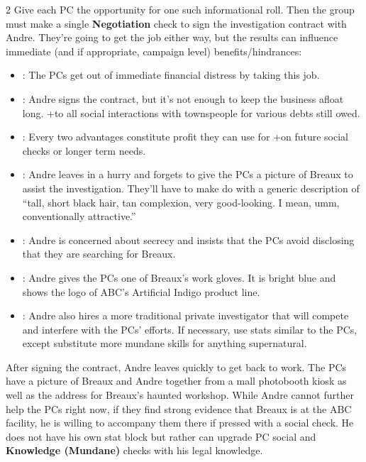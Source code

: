 \documentclass{book}
\newcommand{\df}{\DifficultyDie }
\newcommand{\stb}{\SetbackDie }
\newcommand{\ch}{\ChallengeDie }
\newcommand{\bbb}{\BoostDie }
\newcommand{\ai}{{\color{cyan}Artificial Indigo}\xspace}
\begin{document}
\begin{multicols*}{2}
Give each PC the opportunity for one such informational roll.  Then the group must make a single \ch\df\df\textbf{Negotiation} check to sign the investigation contract with Andre.  They're going to get the job either way, but the results can influence immediate (and if appropriate, campaign level) benefits/hindrances:

\begin{itemize}
    \setlength\itemsep{-.5em}
        \item \Success: The PCs get out of immediate financial distress by taking this job.
        \item \Failure: Andre signs the contract, but it's not enough to keep the business afloat long.  +\stb to all social interactions with townspeople for various debts still owed.
        \item \Advantage\Advantage: Every two advantages constitute profit they can use for +\bbb on future social checks or longer term needs.
        \item \Threat\Threat: Andre leaves in a hurry and forgets to give the PCs a picture of Breaux to assist the investigation.  They'll have to make do with a generic description of ``tall, short black hair, tan complexion, very good-looking.  I mean, umm, conventionally attractive.''
        \item \Threat\Threat\Threat: Andre is concerned about secrecy and insists that the PCs avoid disclosing that they are searching for Breaux.
        \item \Triumph: Andre gives the PCs one of Breaux's work gloves. It is bright blue and shows the logo of ABC's \ai product line.
        \item \Despair: Andre also hires a more traditional private investigator that will compete and interfere with the PCs' efforts.  If necessary, use stats similar to the PCs, except substitute more mundane skills for anything supernatural.
    \end{itemize}

After signing the contract, Andre leaves quickly to get back to work.  The PCs have a picture of Breaux and Andre together from a mall photobooth kiosk as well as the address for Breaux's haunted workshop.  While Andre cannot further help the PCs right now, if they find strong evidence that Breaux is at the ABC facility, he is willing to accompany them there if pressed with a social check.  He does not have his own stat block but rather can upgrade PC social and \textbf{Knowledge (Mundane)} checks with his legal knowledge.


\end{multicols*}
\end{document}
